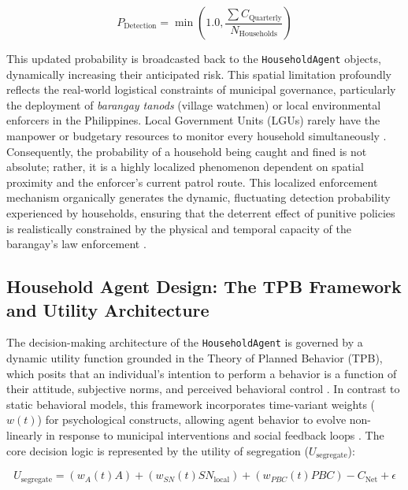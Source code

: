 \begin{equation}
    P_{\mathrm{Detection}} = \min\left(1.0, \frac{\sum C_{\mathrm{Quarterly}}}{N_{\mathrm{Households}}}\right)
    \label{eq:prob_detection}
\end{equation}

This updated probability is broadcasted back to the \texttt{HouseholdAgent} objects, dynamically increasing their anticipated risk. This spatial limitation profoundly reflects the real-world logistical constraints of municipal governance, particularly the deployment of \textit{barangay tanods} (village watchmen) or local environmental enforcers in the Philippines. Local Government Units (LGUs) rarely have the manpower or budgetary resources to monitor every household simultaneously \citep{Abordo2025}. Consequently, the probability of a household being caught and fined is not absolute; rather, it is a highly localized phenomenon dependent on spatial proximity and the enforcer's current patrol route. This localized enforcement mechanism organically generates the dynamic, fluctuating detection probability experienced by households, ensuring that the deterrent effect of punitive policies is realistically constrained by the physical and temporal capacity of the barangay's law enforcement \citep{Jimenez2025}.

\subsection{Household Agent Design: The TPB Framework and Utility Architecture}

The decision-making architecture of the \texttt{HouseholdAgent} is governed by a dynamic utility function grounded in the Theory of Planned Behavior (TPB), which posits that an individual's intention to perform a behavior is a function of their attitude, subjective norms, and perceived behavioral control \citep{Ceschi2021}. In contrast to static behavioral models, this framework incorporates time-variant weights ($w(t)$) for psychological constructs, allowing agent behavior to evolve non-linearly in response to municipal interventions and social feedback loops \citep{Taraghi2025, Ma2023}. The core decision logic is represented by the utility of segregation ($U_{\mathrm{segregate}}$):

\begin{equation}
    U_{\mathrm{segregate}} = (w_A(t) A) + (w_{SN}(t) SN_{\mathrm{local}}) + (w_{PBC}(t)  PBC) - C_{\mathrm{Net}} + \epsilon
    \label{eq:utility_function}
\end{equation}

